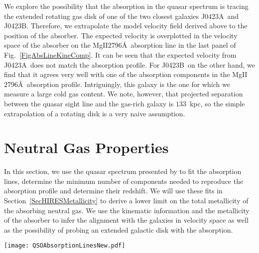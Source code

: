 \documentclass[a4paper,fleqn,usenatbib]{mnras}
\newcommand{\GalA}{J0423A}
\newcommand{\GalB}{J0423B}
\begin{document}
{We explore the possibility that the absorption in the quasar spectrum is tracing the extended rotating gas disk of one of the two closest galaxies \GalA\ and \GalB. Therefore, we extrapolate the model velocity field derived above to the position of the absorber. The expected velocity is overplotted in the velocity space of the absorber on the MgII$2796$\AA\ absorption line in the last panel of Fig.~\ref{FigAbsLineKineComp}. It can be seen that the expected velocity from \GalA\ does not match the absorption profile. For \GalB\, on the other hand, we find that it agrees very well with one of the absorption components in the MgII$2796$\AA\ absorption profile. Intriguingly, this galaxy is the one for which we measure a large cold gas content. We note, however, that projected separation between the quasar sight line and the gas-rich galaxy is $133$~kpc, so the simple extrapolation of a rotating disk is a very naive assumption.


\section{Neutral Gas Properties}
\label{SecHiresSpec}

In this section, we use the quasar spectrum presented by \mbox{\citet{Churchill1996spatial}} to fit the absorption lines, determine the minimum number of components needed to reproduce the absorption profile and determine their redshift. We will use these fits in Section~\ref{SecHIRESMetallicity} to derive a lower limit on the total metallicity of the absorbing neutral gas. We use the kinematic information and the metallicity of the absorber to infer the alignment with the galaxies in velocity space as well as the possibility of probing an extended galactic disk with the absorption.

\begin{figure*}
\texttt{[image: QSOAbsorptionLinesNew.pdf]}
\caption{Fits to the FeII$2382$\AA, FeII$2600$\AA, MgII$2796$\AA, MgII$2803$\AA, MgI$2852$\AA\ absorption lines in the QSO spectrum. In the fitting using vpfit we assumed two components for FeII and MgI and six components for the saturated MgII. Velocity zero corresponds to the redshift of the main component from the joint fits of FeII$2600$\AA, FeII$2382$\AA, MgI$2852$\AA. The last panel shows a comparison of the MgII$2796$\AA\ absorption line profile with the expected absorption caused by an extended rotating disk of \GalA\ and \GalB\ at the position of the quasar sight-line. We find that the absorption cannot be caused by an extended disk of \GalA, but the velocity extrapolated from the disk of \GalB\ matches the absorption profile. We note, however, that due to the large impact parameter of $133$~kpc the absorption is unlikely tracing the disk of \GalB.}
\label{FigQSOAbsLines}
\label{FigAbsLineKineComp}
\end{figure*}

}
\end{document}
